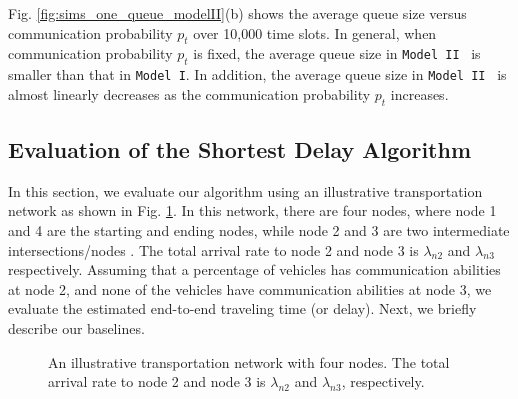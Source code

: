 \documentclass[conference]{IEEEtran}
\newcommand{\modelI}{{\tt{Model I}}}
\newcommand{\modelII}{{\tt{Model II}}}
\begin{document}
Fig. \ref{fig:sims_one_queue_modelII}(b) shows the average queue size versus communication probability $p_t$ over 10,000 time slots. In general, when communication probability $p_t$ is fixed, the average queue size in \modelII~ is smaller than that in \modelI. In addition, the average queue size in \modelII~ is almost linearly decreases as the communication probability $p_t$ increases.



\vspace{-5pt}
\subsection{Evaluation of the Shortest Delay Algorithm}
In this section, we evaluate our algorithm using an illustrative transportation network as shown in Fig. \ref{roadmodel1}.
In this network, there are four nodes, where node 1 and 4 are the starting and ending nodes, while node 2 and 3 are two intermediate intersections/nodes . The total arrival rate to node 2 and node 3 is $\lambda_{n2}$ and $\lambda_{n3}$ respectively. Assuming that a percentage of vehicles has communication abilities at node 2, and none of the vehicles have communication abilities at node 3, we evaluate the estimated end-to-end traveling time (or delay). Next, we briefly describe our baselines.

\begin{figure} [t!]
\vspace{10pt}
\centering
{}
\vspace{-5pt}
\caption{An illustrative transportation network with four nodes. The total arrival rate to node 2 and node 3 is $\lambda_{n2}$ and $\lambda_{n3}$, respectively.}
\vspace{-5pt}
\label{roadmodel1}
\end{figure}
\end{document}
